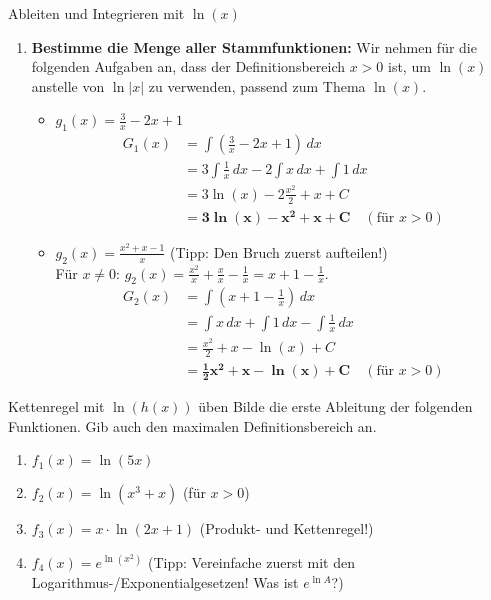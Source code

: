 \begin{loesungsumgebung}{Ableiten und Integrieren mit \texorpdfstring{$\ln(x)$}{ln(x)}}
\begin{enumerate}[label=(\alph*)]
    \item \textbf{Bestimme die Menge aller Stammfunktionen:}
    Wir nehmen für die folgenden Aufgaben an, dass der Definitionsbereich $x>0$ ist, um $\ln(x)$ anstelle von $\ln|x|$ zu verwenden, passend zum Thema $\ln(x)$.
    \begin{itemize}
        \item \textbf{$g_1(x) = \frac{3}{x} - 2x + 1$} \\
        \begin{align*} G_1(x) &= \int \left(\frac{3}{x} - 2x + 1\right) \,dx \\ &= 3\int \frac{1}{x} \,dx - 2\int x \,dx + \int 1 \,dx \\ &= 3\ln(x) - 2\frac{x^2}{2} + x + C \\ &= \mathbf{3\ln(x) - x^2 + x + C} \quad (\text{für } x>0) \end{align*}

        \item \textbf{$g_2(x) = \frac{x^2+x-1}{x}$} (Tipp: Den Bruch zuerst aufteilen!) \\
        Für $x \neq 0$: $g_2(x) = \frac{x^2}{x} + \frac{x}{x} - \frac{1}{x} = x + 1 - \frac{1}{x}$.
        \begin{align*} G_2(x) &= \int \left(x + 1 - \frac{1}{x}\right) \,dx \\ &= \int x \,dx + \int 1 \,dx - \int \frac{1}{x} \,dx \\ &= \frac{x^2}{2} + x - \ln(x) + C \\ &= \mathbf{\frac{1}{2}x^2 + x - \ln(x) + C} \quad (\text{für } x>0) \end{align*}
    \end{itemize}
\end{enumerate}

\end{loesungsumgebung}



\begin{aufgabenumgebung}{Kettenregel mit \texorpdfstring{$\ln(h(x))$}{ln(h(x))} üben}
Bilde die erste Ableitung der folgenden Funktionen. Gib auch den maximalen Definitionsbereich an.
\begin{enumerate}
    \item $f_1(x) = \ln(5x)$
    \item $f_2(x) = \ln(x^3+x)$ (für $x>0$)
    \item $f_3(x) = x \cdot \ln(2x+1)$ (Produkt- und Kettenregel!)
    \item $f_4(x) = e^{\ln(x^2)}$ (Tipp: Vereinfache zuerst mit den Logarithmus-/Exponentialgesetzen! Was ist $e^{\ln A}$?)
\end{enumerate}
\end{aufgabenumgebung}

